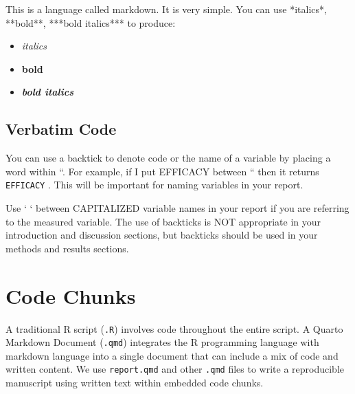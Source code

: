 \documentclass[
  english,
  letterpaper,
  DIV=11,
  numbers=noendperiod]{scrreprt}
\newenvironment{Shaded}{\begin{snugshade}}{\end{snugshade}}
\newcommand{\NormalTok}[1]{\textcolor[rgb]{0.00,0.23,0.31}{#1}}
\providecommand{\tightlist}{%
  \setlength{\itemsep}{0pt}\setlength{\parskip}{0pt}}
\begin{document}
\begin{Shaded}
\begin{Highlighting}[]
\NormalTok{This is a language called markdown. It is very simple. You can use}
\NormalTok{*italics*, **bold**, ***bold italics*** to produce:}
\end{Highlighting}
\end{Shaded}

\begin{itemize}
\tightlist
\item
  \emph{italics}
\item
  \textbf{bold}
\item
  \textbf{\emph{bold italics}}
\end{itemize}

\section{Verbatim Code}\label{verbatim-code}

You can use a backtick to denote code or the name of a variable by
placing a word within ``. For example, if I put EFFICACY between `` then
it returns \texttt{EFFICACY} . This will be important for naming
variables in your report.

\begin{tcolorbox}[enhanced jigsaw, title=\textcolor{quarto-callout-important-color}{\faExclamation}\hspace{0.5em}{Requirement}, opacityback=0, colframe=quarto-callout-important-color-frame, rightrule=.15mm, left=2mm, toprule=.15mm, leftrule=.75mm, titlerule=0mm, bottomtitle=1mm, breakable, arc=.35mm, toptitle=1mm, bottomrule=.15mm, coltitle=black, opacitybacktitle=0.6, colback=white, colbacktitle=quarto-callout-important-color!10!white]

Use ` ` between CAPITALIZED variable names in your report if you are
referring to the measured variable. The use of backticks is NOT
appropriate in your introduction and discussion sections, but backticks
should be used in your methods and results sections.

\end{tcolorbox}

\chapter{Code Chunks}\label{code-chunks}

A traditional R script (\texttt{.R}) involves code throughout the entire
script. A Quarto Markdown Document (\texttt{.qmd}) integrates the R
programming language with markdown language into a single document that
can include a mix of code and written content. We use
\texttt{report.qmd} and other \texttt{.qmd} files to write a
reproducible manuscript using written text within embedded code chunks.
\end{document}
